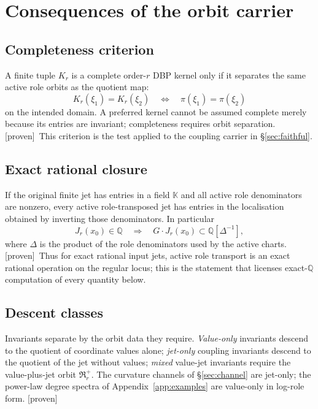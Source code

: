 \documentclass[11pt]{article}
\newcommand{\Proven}{\textsf{[proven]}}
\theoremstyle{plain}
\theoremstyle{definition}
\begin{document}
\section{Consequences of the orbit carrier}
\label{sec:consequences}

\subsection{Completeness criterion}
A finite tuple $K_r$ is a complete order-$r$ DBP kernel only if it separates the same active role
orbits as the quotient map:
\[
K_r(\xi_1)=K_r(\xi_2)\quad\Longleftrightarrow\quad \pi(\xi_1)=\pi(\xi_2)
\]
on the intended domain. A preferred kernel cannot be assumed complete merely because its entries are
invariant; completeness requires orbit separation. \Proven\ This criterion is the test applied to the
coupling carrier in \S\ref{sec:faithful}.

\subsection{Exact rational closure}
If the original finite jet has entries in a field $\mathbb K$ and all active role denominators are
nonzero, every active role-transposed jet has entries in the localisation obtained by inverting those
denominators. In particular
\[
J_r(x_0)\in\mathbb Q\quad\Longrightarrow\quad G\cdot J_r(x_0)\subset\mathbb Q[\Delta^{-1}],
\]
where $\Delta$ is the product of the role denominators used by the active charts. \Proven\ Thus for
exact rational input jets, active role transport is an exact rational operation on the regular locus;
this is the statement that licenses exact-$\mathbb Q$ computation of every quantity below.

\subsection{Descent classes}
Invariants separate by the orbit data they require. \emph{Value-only} invariants descend to the
quotient of coordinate values alone; \emph{jet-only} coupling invariants descend to the quotient of
the jet without values; \emph{mixed} value-jet invariants require the value-plus-jet orbit
$\mathfrak R_r^{+}$. The curvature channels of \S\ref{sec:channel} are jet-only; the power-law degree
spectra of Appendix~\ref{app:examples} are value-only in log-role form. \Proven

\end{document}
